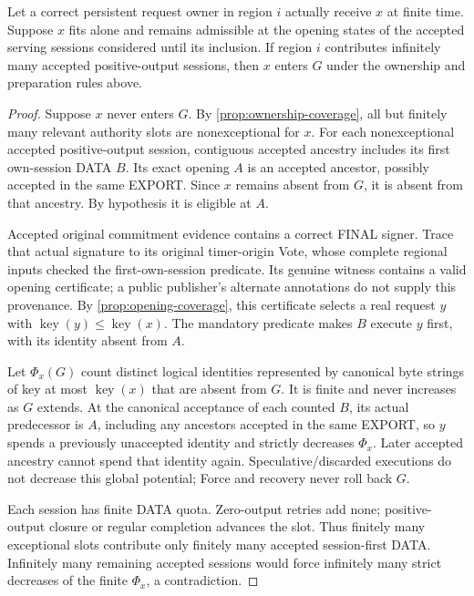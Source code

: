 \begin{proposition}
\label{prop:session-input-progress}
\label{prop:v38-request-inclusion}
Let a correct persistent request owner in region $i$ actually receive
$x$ at finite time. Suppose $x$ fits alone and remains admissible at the
opening states of the accepted serving sessions considered until its
inclusion. If region $i$ contributes infinitely many accepted
positive-output sessions, then $x$ enters $G$ under the ownership and
preparation rules above.
\end{proposition}
\begin{proof}
Suppose $x$ never enters $G$. By \cref{prop:ownership-coverage}, all but
finitely many relevant authority slots are nonexceptional for $x$.
For each nonexceptional accepted positive-output session, contiguous
accepted ancestry includes its first own-session DATA $B$. Its exact
opening $A$ is an accepted ancestor, possibly accepted in the same
EXPORT. Since $x$ remains absent from $G$, it is absent from that
ancestry. By hypothesis it is eligible at $A$.

Accepted original commitment evidence contains a correct FINAL signer.
Trace that actual signature to its original timer-origin Vote, whose
complete regional inputs checked the first-own-session predicate.
Its genuine witness contains a valid opening certificate; a public
publisher's alternate annotations do not supply this provenance.
By \cref{prop:opening-coverage}, this certificate selects a real
request $y$ with $\operatorname{key}(y)\le\operatorname{key}(x)$.
The mandatory predicate makes $B$ execute $y$ first, with its identity
absent from $A$.

Let $\Phi_x(G)$ count distinct logical identities represented by
canonical byte strings of key at most $\operatorname{key}(x)$ that
are absent from $G$. It is finite and never increases as $G$ extends.
At the canonical acceptance of each counted $B$, its actual predecessor
is $A$, including any ancestors accepted in the same EXPORT, so $y$
spends a previously unaccepted identity and strictly decreases
$\Phi_x$. Later accepted ancestry cannot spend that identity again.
Speculative/discarded executions do not decrease this global potential;
Force and recovery never roll back $G$.

Each session has finite DATA quota. Zero-output retries add none;
positive-output closure or regular completion advances the slot.
Thus finitely many exceptional slots contribute only finitely many
accepted session-first DATA. Infinitely many remaining accepted
sessions would force infinitely many strict decreases of the finite
$\Phi_x$, a contradiction.
\end{proof}

